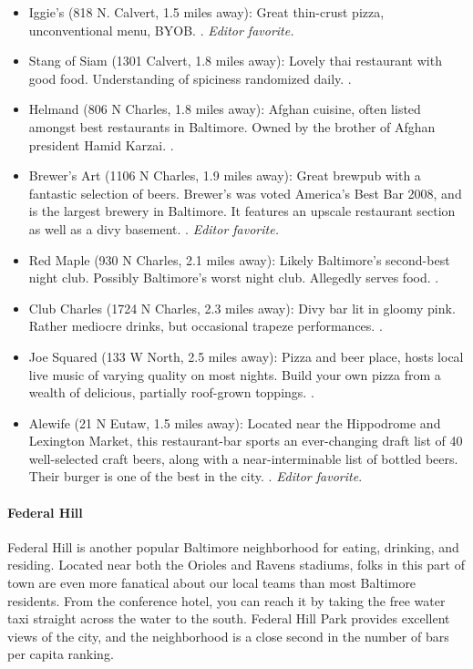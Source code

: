 \begin{itemize}
\item{Iggie's (818 N. Calvert, 1.5 miles away): Great thin-crust pizza, unconventional menu, BYOB. \postdoc. \it{Editor favorite}.}
\item{Stang of Siam (1301 Calvert, 1.8 miles away): Lovely thai restaurant with good food. Understanding of spiciness randomized daily. \postdoc.}
\item{Helmand (806 N Charles, 1.8 miles away): Afghan cuisine, often listed amongst best restaurants in Baltimore. Owned by the brother of Afghan president Hamid Karzai. \professor.}
\item{Brewer's Art (1106 N Charles, 1.9 miles away): Great brewpub with a fantastic selection of beers. Brewer's was voted America's Best Bar 2008, and is the largest brewery in Baltimore. It features an upscale restaurant section as well as a divy basement. \postdoc. \it{Editor favorite}.}
\item{Red Maple (930 N Charles, 2.1 miles away): Likely Baltimore's second-best night club. Possibly Baltimore's worst night club. Allegedly serves food. \postdoc.}
\item{Club Charles (1724 N Charles, 2.3 miles away): Divy bar lit in gloomy pink. Rather mediocre drinks, but occasional trapeze performances. \gradstudent.}
\item{Joe Squared (133 W North, 2.5 miles away): Pizza and beer place, hosts local live music of varying quality on most nights.  Build your own pizza from a wealth of delicious, partially roof-grown toppings. \postdoc.}
\item{Alewife (21 N Eutaw, 1.5 miles away): Located near the Hippodrome and Lexington Market, this restaurant-bar sports an ever-changing draft list of 40 well-selected craft beers, along with a near-interminable list of bottled beers. Their burger is one of the best in the city. \postdoc. {\it Editor favorite}.}
\end{itemize}


\paragraph*{Federal Hill}
Federal Hill is another popular Baltimore neighborhood for eating, drinking, and residing. Located near both the Orioles and Ravens stadiums, folks in this part of town are even more fanatical about our local teams than most Baltimore residents. From the conference hotel, you can reach it by taking the free water taxi straight across the water to the south. Federal Hill Park provides excellent views of the city, and the neighborhood is a close second in the number of bars per capita ranking. 

